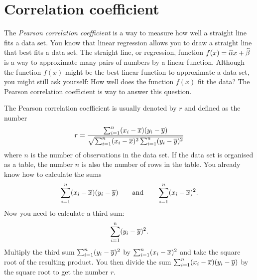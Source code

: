 \documentclass[a4paper,oneside,12pt]{article}
\begin{document}

\section{Correlation coefficient}

The \emph{Pearson correlation coefficient} is a way to measure how
well a straight line fits a data set.  You know that linear regression
allows you to draw a straight line that best fits a data set.  The
straight line, or regression, function $f(x) = \widehat{\alpha} x + \widehat{\beta}$
is a way to approximate many pairs of numbers by a linear function.
Although the function $f(x)$ might be the best linear function to
approximate a data set, you might still ask yourself: How well does
the function $f(x)$ fit the data?  The Pearson correlation coefficient
is way to answer this question.

The Pearson correlation coefficient is usually denoted by $r$ and
defined as the number
\begin{equation}
\label{eqn:Pearson_correlation_coefficient}
r
=
\frac{
  \sum_{i=1}^n (x_i - \overline{x}) (y_i - \overline{y})
}{
  \sqrt{
    \sum_{i=1}^n (x_i - \overline{x})^2 \sum_{i=1}^n (y_i - \overline{y})^2
  }
}
\end{equation}
where $n$ is the number of observations in the data set.  If the data
set is organised as a table, the number $n$ is also the number of rows
in the table.  You already know how to calculate the sums
\[
\sum_{i=1}^n (x_i - \overline{x}) (y_i - \overline{y})
\qquad
\text{and}
\qquad
\sum_{i=1}^n (x_i - \overline{x})^2.
\]
Now you need to calculate a third sum:
\[
\sum_{i=1}^n (y_i - \overline{y})^2.
\]
Multiply the third sum $\sum_{i=1}^n (y_i - \overline{y})^2$ by
$\sum_{i=1}^n (x_i - \overline{x})^2$ and take the square root of the
resulting product.  You then divide the sum
$\sum_{i=1}^n (x_i - \overline{x}) (y_i - \overline{y})$ by the square root to get
the number $r$.
\end{document}

